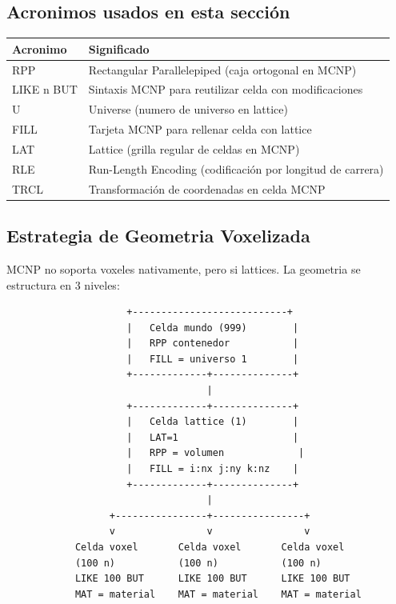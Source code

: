 \documentclass[12pt,a4paper]{article}
\begin{document}
\subsection*{Acronimos usados en esta sección}
\begin{tabular}{ll}
\toprule
\textbf{Acronimo} & \textbf{Significado} \\
\midrule
RPP & Rectangular Parallelepiped (caja ortogonal en MCNP) \\
LIKE n BUT & Sintaxis MCNP para reutilizar celda con modificaciones \\
U & Universe (numero de universo en lattice) \\
FILL & Tarjeta MCNP para rellenar celda con lattice \\
LAT & Lattice (grilla regular de celdas en MCNP) \\
RLE & Run-Length Encoding (codificación por longitud de carrera) \\
TRCL & Transformación de coordenadas en celda MCNP \\
\bottomrule
\end{tabular}

\subsection{Estrategia de Geometria Voxelizada}

MCNP no soporta voxeles nativamente, pero si lattices. La geometria se estructura en 3 niveles:

\begin{lstlisting}
                     +---------------------------+
                     |   Celda mundo (999)        |
                     |   RPP contenedor           |
                     |   FILL = universo 1        |
                     +-------------+--------------+
                                   |
                     +-------------+--------------+
                     |   Celda lattice (1)        |
                     |   LAT=1                    |
                     |   RPP = volumen             |
                     |   FILL = i:nx j:ny k:nz    |
                     +-------------+--------------+
                                   |
                  +----------------+----------------+
                  v                v                v
            Celda voxel       Celda voxel       Celda voxel
            (100 n)           (100 n)           (100 n)
            LIKE 100 BUT      LIKE 100 BUT      LIKE 100 BUT
            MAT = material    MAT = material    MAT = material
\end{lstlisting}
\end{document}
